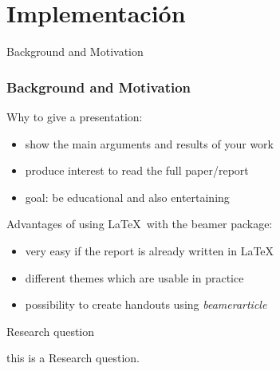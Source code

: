 \section{Implementación}
\begin{frame}{Background and Motivation}
    \frametitle<presentation>{Background and Motivation}
    \begin{block}{Why to give a presentation:}
        \begin{itemize}
            \item show the main arguments and results of your work
            \item produce interest to read the full paper/report
            \item goal: be educational and also entertaining
        \end{itemize}
    \end{block}
    \begin{block}{Advantages of using \LaTeX ~with the beamer package:}
        \begin{itemize}
            \item very easy if the report is already written in \LaTeX
            \item different themes which are usable in practice
            \item possibility to create handouts using \emph{beamerarticle}
        \end{itemize}
    \end{block}
\end{frame}

\begin{frame}{Research question}

    this is a Research question.

\end{frame}
